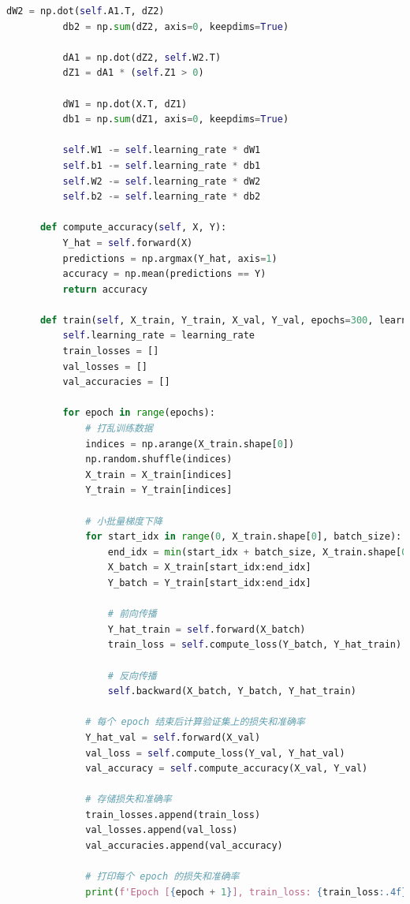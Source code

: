 \documentclass[12pt]{article}
\begin{document}
\begin{lstlisting}[language=Python]
          dW2 = np.dot(self.A1.T, dZ2)
          db2 = np.sum(dZ2, axis=0, keepdims=True)
  
          dA1 = np.dot(dZ2, self.W2.T)
          dZ1 = dA1 * (self.Z1 > 0)
  
          dW1 = np.dot(X.T, dZ1)
          db1 = np.sum(dZ1, axis=0, keepdims=True)
  
          self.W1 -= self.learning_rate * dW1
          self.b1 -= self.learning_rate * db1
          self.W2 -= self.learning_rate * dW2
          self.b2 -= self.learning_rate * db2
  
      def compute_accuracy(self, X, Y):
          Y_hat = self.forward(X)
          predictions = np.argmax(Y_hat, axis=1)
          accuracy = np.mean(predictions == Y)
          return accuracy
  
      def train(self, X_train, Y_train, X_val, Y_val, epochs=300, learning_rate=0.01):
          self.learning_rate = learning_rate
          train_losses = []
          val_losses = []
          val_accuracies = []
  
          for epoch in range(epochs):
              # 打乱训练数据
              indices = np.arange(X_train.shape[0])
              np.random.shuffle(indices)
              X_train = X_train[indices]
              Y_train = Y_train[indices]
  
              # 小批量梯度下降
              for start_idx in range(0, X_train.shape[0], batch_size):
                  end_idx = min(start_idx + batch_size, X_train.shape[0])
                  X_batch = X_train[start_idx:end_idx]
                  Y_batch = Y_train[start_idx:end_idx]
  
                  # 前向传播
                  Y_hat_train = self.forward(X_batch)
                  train_loss = self.compute_loss(Y_batch, Y_hat_train)
                  
                  # 反向传播
                  self.backward(X_batch, Y_batch, Y_hat_train)
  
              # 每个 epoch 结束后计算验证集上的损失和准确率
              Y_hat_val = self.forward(X_val)
              val_loss = self.compute_loss(Y_val, Y_hat_val)
              val_accuracy = self.compute_accuracy(X_val, Y_val)
              
              # 存储损失和准确率
              train_losses.append(train_loss)
              val_losses.append(val_loss)
              val_accuracies.append(val_accuracy)
              
              # 打印每个 epoch 的损失和准确率
              print(f'Epoch [{epoch + 1}], train_loss: {train_loss:.4f}, val_loss: {val_loss:.4f}, val_acc: {val_accuracy:.4f}')
          

\end{lstlisting}
\end{document}
